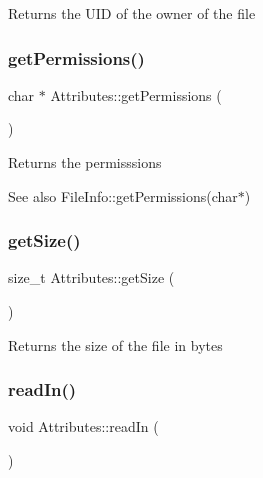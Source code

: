\begin{DoxyReturn}{Returns}
the U\+ID of the owner of the file 
\end{DoxyReturn}
\mbox{\label{classAttributes_af538b17bd7a459f4664446c574d83bd5}} 
\subsubsection{\texorpdfstring{get\+Permissions()}{getPermissions()}}
{\footnotesize\ttfamily char $\ast$ Attributes\+::get\+Permissions (\begin{DoxyParamCaption}{ }\end{DoxyParamCaption})}

\begin{DoxyReturn}{Returns}
the permisssions 
\end{DoxyReturn}
\begin{DoxySeeAlso}{See also}
File\+Info\+::get\+Permissions(char$\ast$) 
\end{DoxySeeAlso}
\mbox{\label{classAttributes_af9970a8e76e48221ec9d7832e1e558a3}} 
\subsubsection{\texorpdfstring{get\+Size()}{getSize()}}
{\footnotesize\ttfamily size\+\_\+t Attributes\+::get\+Size (\begin{DoxyParamCaption}{ }\end{DoxyParamCaption})}

\begin{DoxyReturn}{Returns}
the size of the file in bytes 
\end{DoxyReturn}
\mbox{\label{classAttributes_a6fc0012ff20912b8ee30167fefd1ab85}} 
\subsubsection{\texorpdfstring{read\+In()}{readIn()}}
{\footnotesize\ttfamily void Attributes\+::read\+In (\begin{DoxyParamCaption}{ }\end{DoxyParamCaption})}

